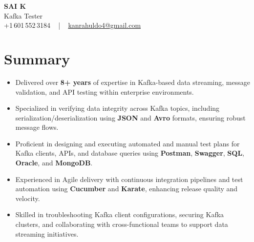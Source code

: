 \documentclass[letterpaper,11pt]{article}
\newcommand{\resumeItem}[1]{
  \item\footnotesize{
    {#1 \vspace{-2pt}}
  }
}
\newcommand{\resumeItemListStart}{\begin{itemize}[leftmargin=*]}
\newcommand{\resumeItemListEnd}{\end{itemize}\vspace{-5pt}}
\begin{document}
\begin{center}
    {\fontsize{14pt}{12pt}\selectfont \textbf{\MakeUppercase{Sai K}}}\\ \vspace{2pt}
    \fontsize{10pt}{12pt}\selectfont Kafka Tester\\ \vspace{2pt}
    \fontsize{10pt}{12pt}\selectfont +1\,601\,552\,3184 ~ | ~
    \href{mailto:kanrahuldo4@gmail.com}{kanrahuldo4@gmail.com}
    \vspace{-10pt}
\end{center}

\section{Summary}
\fontsize{9pt}{10pt}\selectfont
\resumeItemListStart
  \resumeItem{Delivered over \textbf{8+ years} of expertise in Kafka-based data streaming, message validation, and API testing within enterprise environments.}
  \resumeItem{Specialized in verifying data integrity across Kafka topics, including serialization/deserialization using \textbf{JSON} and \textbf{Avro} formats, ensuring robust message flows.}
  \resumeItem{Proficient in designing and executing automated and manual test plans for Kafka clients, APIs, and database queries using \textbf{Postman}, \textbf{Swagger}, \textbf{SQL}, \textbf{Oracle}, and \textbf{MongoDB}.}
  \resumeItem{Experienced in Agile delivery with continuous integration pipelines and test automation using \textbf{Cucumber} and \textbf{Karate}, enhancing release quality and velocity.}
  \resumeItem{Skilled in troubleshooting Kafka client configurations, securing Kafka clusters, and collaborating with cross-functional teams to support data streaming initiatives.}
\resumeItemListEnd
\vspace{-6pt}

\end{document}
